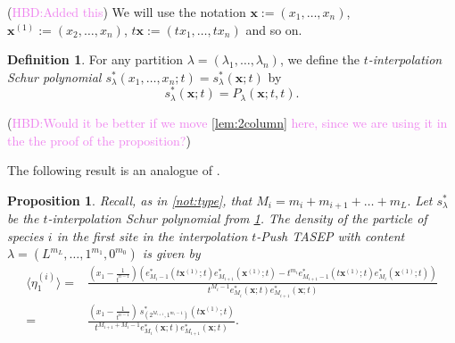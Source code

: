 \documentclass[12pt]{amsart}
\newtheorem{prop}[thm]{Proposition}
\theoremstyle{definition}
\newtheorem{definition}[thm]{Definition}
\newcommand{\bfx}{\boldsymbol{x}}
\def\LW#1{(\textcolor{teal}{LW:#1})}
\def\HBD#1{(\textcolor{violet}{HBD:#1})}
\begin{document}
\HBD{Added this}
We will use the notation $\bfx:=(x_1,\dots,x_n)$, $\bfx^{(1)}:=(x_2,\dots,x_n)$,  $t\bfx:=(tx_1,\dots,tx_n)$ and so on.
\begin{definition}\label{def:sstar}
For any partition $\lambda=(\lambda_1,\dots,\lambda_n)$, we define the \emph{$t$-interpolation Schur polynomial 
$s_\lambda^*(x_1,\dots,x_n;t)=s^*_\lambda(\bfx;t)$} by
    $$s^*_\lambda(\bfx;t)=P_\lambda(\bfx;t,t).$$
\end{definition}

\HBD{Would it be better if we move \cref{lem:2column} here, since we are using it in the the proof of the proposition?}

The following result is an analogue of \cite[Corollary 7.1]{AyyerMartinWilliams2025}.  

\begin{prop}
Recall, as in \cref{not:type}, that  $M_i = m_i+m_{i+1} + \dots + m_L.$  Let $s^*_{\lambda}$ be the $t$-interpolation Schur polynomial from \cref{def:sstar}.
   The density of the particle of species $i$ in the first site in 
   the interpolation $t$-Push TASEP with content $\lambda=(L^{m_L}, \dots, 1^{m_1}, 0^{m_0})$ is given by
   \small{
   \begin{align*}
       \langle \eta_1^{(i)} \rangle =&
       \frac{(x_1-\frac{1}{t^{n-1}}) \left(e_{M_i-1}^*\left(t\bfx^{(1)};t\right) e^*_{M_{i+1}}\left(\bfx^{(1)};t\right)  - t^{m_i} e_{M_{i+1}-1}^*\left(t\bfx^{(1)};t\right) e_{M_i}^*\left(\bfx^{(1)};t\right) \right)}{t^{M_{i}-1} e^*_{M_i}\left(\bfx;t\right) e^*_{M_{i+1}}\left(\bfx;t\right)} \\
       =&
       \frac{(x_1-\frac{1}{t^{n-1}}) 
       \ s^*_{(2^{M_{i+1}},1^{m_i-1})}\left(t\bfx^{(1)};t\right)
       }{t^{M_{i+1}+M_i-1} e^*_{M_i}\left(\bfx;t\right)e^*_{M_{i+1}}\left(\bfx;t\right)}.
   \end{align*}}
\end{prop}
\end{document}
